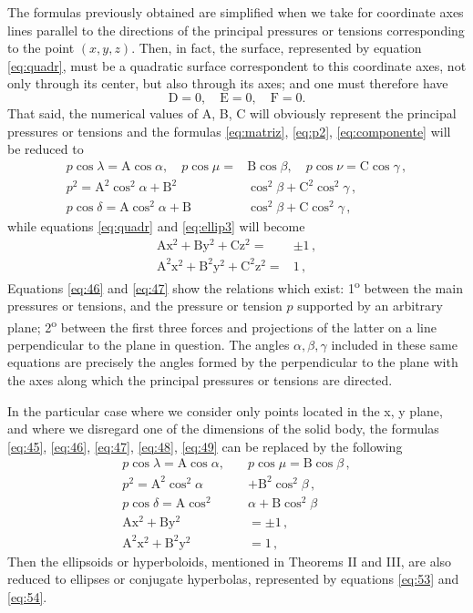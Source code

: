 \documentclass[leqno,openright,smallroyalvopaper,8pt,twoside,showtrims]{memoir}
\begin{document}
The formulas previously obtained are simplified when we take for coordinate axes lines parallel to the directions of the principal pressures or tensions corresponding to the point $(x, y, z)$. Then, in fact, the surface, represented by equation \eqref{eq:quadr}, must be a quadratic surface correspondent to this coordinate axes, not only through its center, but also through its axes; and one must therefore have
\begin{equation*}
\text{D}=0,\quad \text{E}=0,\quad \text{F}=0.
\end{equation*}
That said, the numerical values of A, B, C will obviously represent the principal pressures or tensions and the formulas \eqref{eq:matriz}, \eqref{eq:p2}, \eqref{eq:componente} will be reduced to
\begin{align}
p\cos\lambda=\text{A}\cos\alpha,\quad p\cos\mu=&\text{B}\cos\beta,\quad p\cos\nu=\text{C}\cos\gamma\label{eq:45}\,,\\
p^2=\text{A}^2\cos^2\alpha+\text{B}^2&\cos^2\beta+\text{C}^2\cos^2\gamma\,,\label{eq:46}\\
p\cos\delta=\text{A}\cos^2\alpha+\text{B}&\cos^2\beta+\text{C}\cos^2\gamma\,\label{eq:47},
\end{align}
while equations \eqref{eq:quadr} and \eqref{eq:ellip3} will become
\begin{align}
\text{A}\text{x}^2+\text{B}\text{y}^2+\text{C}\text{z}^2=&\pm 1\label{eq:48}\,,\\
\text{A}^2\text{x}^2+\text{B}^2\text{y}^2+\text{C}^2\text{z}^2=&1\label{eq:49}\,,
\end{align}
Equations \eqref{eq:46} and \eqref{eq:47} show the relations which exist: 1\textsuperscript{o} between the main pressures or tensions, and the pressure or tension $p$ supported by an arbitrary plane; 2\textsuperscript{o} between the first three
forces and projections of the latter on a line perpendicular to the plane in question. The angles $\alpha,\beta,\gamma$ included in these same equations are precisely the angles formed by the perpendicular to the plane with the axes along which the principal pressures or tensions are directed.

In the particular case where we consider only points located in the x, y plane, and where we disregard one of the dimensions of the solid body, the formulas \eqref{eq:45}, \eqref{eq:46}, \eqref{eq:47}, \eqref{eq:48}, \eqref{eq:49} can be replaced by the following
\begin{align}
p\cos\lambda=\text{A}\cos\alpha,\quad &p\cos\mu=\text{B}\cos\beta\,,\\
p^2=\text{A}^2\cos^2\alpha&+\text{B}^2\cos^2\beta\,,\\
p\cos\delta=\text{A}\cos^2&\alpha+\text{B}\cos^2\beta\,\\
\text{A}\text{x}^2+\text{B}\text{y}^2&=\pm 1\,,\label{eq:53}\\
\text{A}^2\text{x}^2+\text{B}^2\text{y}^2&=1\,,\label{eq:54}
\end{align}
Then the ellipsoids or hyperboloids, mentioned in Theorems II and III, are also reduced to ellipses or conjugate hyperbolas, represented by equations \eqref{eq:53} and \eqref{eq:54}.
\end{document}
